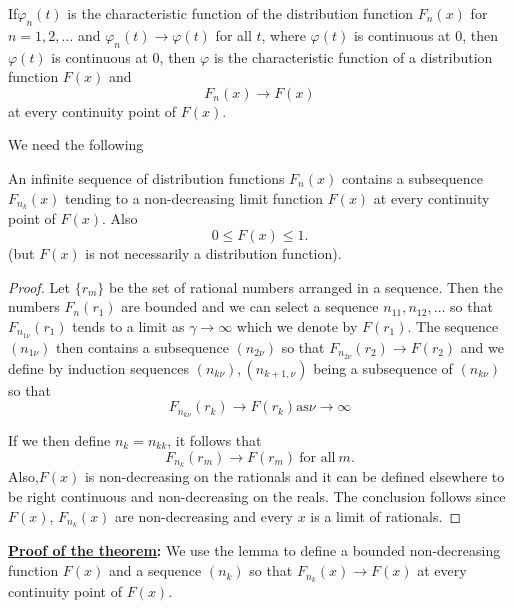 \begin{theorem}\label{chap2:sec6:thm16} %
  If\pageoriginale $\varphi_n (t)$ is the characteristic function of the distribution
  function $F_n (x)$ for $n=1,2, \dots$ and
  $\varphi_n(t)\rightarrow\varphi(t) $  
  for all $t$, where $\varphi (t)$ is continuous at 0, then $\varphi
  (t)$  is continuous at 0, then $\varphi$ is the  characteristic
  function of a distribution function $F(x)$ and 
  $$
  F_n(x) \rightarrow F(x)
  $$
  at every continuity point of $F(x)$.
\end{theorem}
We need the following

\begin{lemma}
  An infinite sequence of distribution functions $F_n (x)$ contains a
  subsequence $F_{n_k}(x)$ tending to a non-decreasing limit 
  function $F(x)$ at every continuity point of $F(x)$. Also
  $$ 
  0 \leq F(x) \leq 1.
  $$
  (but $F(x)$ is not necessarily a distribution function).
\end{lemma}

\begin{proof}
  Let  $\big\{r_m \big\}$ be the set of rational numbers arranged in a
  sequence. Then the numbers $F_n (r_1)$ are bounded and we can select  
  a sequence $n_{11}, n_{12},\dots $ so that $F_{n_{1 \nu}}(r_1)$
  tends to a limit as $\gamma \rightarrow \infty$ which we denote by
  $F(r_1)$.  The sequence $(n_{1 \nu})$ then 
  contains a subsequence $(n_{2 \nu})$ so that  $F_{n_{2 \nu} }(r_2)
  \rightarrow F (r_2)$ and we define by induction sequences $(n_{k\nu}),
  (n_{k+1,\nu})$ being a subsequence of $(n_{k \nu})$ so that
  $$
  F_{n_{k \nu}} (r_k)\rightarrow F(r_k)  \text{as} \nu \rightarrow
  \infty 
  $$
  
  If we then define $ n_k =n_{kk}$, it follows that
  $$ 
  F_{n_k} (r_m)\rightarrow F(r_m) ~\text {for all}~ m.
  $$
  Also,\pageoriginale $F(x)$ is non-decreasing on the rationals and it can be defined
  elsewhere to be right continuous and non-decreasing on the reals.  
  The conclusion follows since $F(x)$, $F_{n_k}  (x)$ are non-decreasing
  and every $x$ is a limit of rationals. 
\end{proof}


\noindent \textbf{\underline{\large Proof of the theorem}:} We use the
lemma to define a 
  bounded non-decreasing function $F(x)$ and a sequence $(n_k)$ so that 
$F_{n_k} (x) \rightarrow F(x)$ at every continuity point of $F(x)$.

